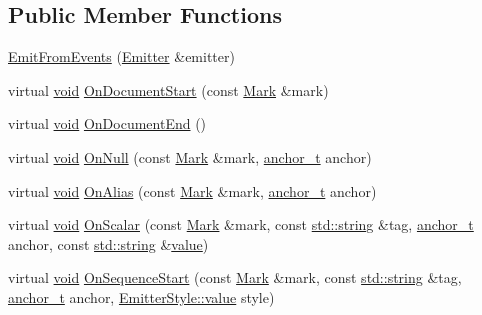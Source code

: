 \subsection*{Public Member Functions}
\begin{DoxyCompactItemize}
\item 
\mbox{\hyperlink{class_y_a_m_l_1_1_emit_from_events_aab86fefb66d3c26ae66c9243b75a1597}{Emit\+From\+Events}} (\mbox{\hyperlink{class_y_a_m_l_1_1_emitter}{Emitter}} \&emitter)
\item 
virtual \mbox{\hyperlink{glad_8h_a950fc91edb4504f62f1c577bf4727c29}{void}} \mbox{\hyperlink{class_y_a_m_l_1_1_emit_from_events_a1099ab75b0df15b3d5b42d07a935a6c6}{On\+Document\+Start}} (const \mbox{\hyperlink{struct_y_a_m_l_1_1_mark}{Mark}} \&mark)
\item 
virtual \mbox{\hyperlink{glad_8h_a950fc91edb4504f62f1c577bf4727c29}{void}} \mbox{\hyperlink{class_y_a_m_l_1_1_emit_from_events_ae9e5f8acf7b2a9dfb74967c11e49cb5e}{On\+Document\+End}} ()
\item 
virtual \mbox{\hyperlink{glad_8h_a950fc91edb4504f62f1c577bf4727c29}{void}} \mbox{\hyperlink{class_y_a_m_l_1_1_emit_from_events_a42f9dfed68e58c2f4289550bdde5be61}{On\+Null}} (const \mbox{\hyperlink{struct_y_a_m_l_1_1_mark}{Mark}} \&mark, \mbox{\hyperlink{namespace_y_a_m_l_abeff1798814ae3402fc5665fdcad1de6}{anchor\+\_\+t}} anchor)
\item 
virtual \mbox{\hyperlink{glad_8h_a950fc91edb4504f62f1c577bf4727c29}{void}} \mbox{\hyperlink{class_y_a_m_l_1_1_emit_from_events_aa002fddfe2450e68bb7dc58c8245b702}{On\+Alias}} (const \mbox{\hyperlink{struct_y_a_m_l_1_1_mark}{Mark}} \&mark, \mbox{\hyperlink{namespace_y_a_m_l_abeff1798814ae3402fc5665fdcad1de6}{anchor\+\_\+t}} anchor)
\item 
virtual \mbox{\hyperlink{glad_8h_a950fc91edb4504f62f1c577bf4727c29}{void}} \mbox{\hyperlink{class_y_a_m_l_1_1_emit_from_events_a9199c18b9ff840043d74400a8a302752}{On\+Scalar}} (const \mbox{\hyperlink{struct_y_a_m_l_1_1_mark}{Mark}} \&mark, const \mbox{\hyperlink{glad_8h_ac83513893df92266f79a515488701770}{std\+::string}} \&tag, \mbox{\hyperlink{namespace_y_a_m_l_abeff1798814ae3402fc5665fdcad1de6}{anchor\+\_\+t}} anchor, const \mbox{\hyperlink{glad_8h_ac83513893df92266f79a515488701770}{std\+::string}} \&\mbox{\hyperlink{glad_8h_a03aff08f73d7fde3d1a08e0abd8e84fa}{value}})
\item 
virtual \mbox{\hyperlink{glad_8h_a950fc91edb4504f62f1c577bf4727c29}{void}} \mbox{\hyperlink{class_y_a_m_l_1_1_emit_from_events_a9c1a257badc0b9631ee52aed5755cd16}{On\+Sequence\+Start}} (const \mbox{\hyperlink{struct_y_a_m_l_1_1_mark}{Mark}} \&mark, const \mbox{\hyperlink{glad_8h_ac83513893df92266f79a515488701770}{std\+::string}} \&tag, \mbox{\hyperlink{namespace_y_a_m_l_abeff1798814ae3402fc5665fdcad1de6}{anchor\+\_\+t}} anchor, \mbox{\hyperlink{struct_y_a_m_l_1_1_emitter_style_ae86640662c85ce6062a37f9636b6959f}{Emitter\+Style\+::value}} style)

\end{DoxyCompactItemize}
